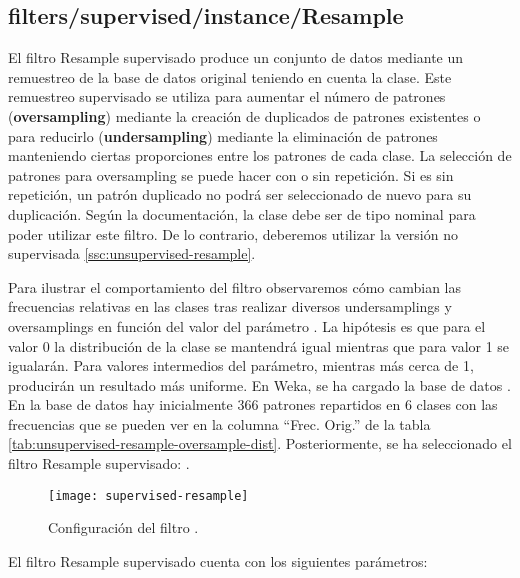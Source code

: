 \subsection{filters/supervised/instance/Resample}
\label{ssc:supervised-resample}
El filtro Resample supervisado produce un conjunto de datos mediante un remuestreo de la base de datos original teniendo en cuenta la clase. Este remuestreo supervisado se utiliza para aumentar el número de patrones (\textbf{oversampling}) mediante la creación de duplicados de patrones existentes o para reducirlo (\textbf{undersampling}) mediante la eliminación de patrones manteniendo ciertas proporciones entre los patrones de cada clase. La selección de patrones para oversampling se puede hacer con o sin repetición. Si es sin repetición, un patrón duplicado no podrá ser seleccionado de nuevo para su duplicación. Según la documentación, la clase debe ser de tipo nominal para poder utilizar este filtro. De lo contrario, deberemos utilizar la versión no supervisada \ref{ssc:unsupervised-resample}.

Para ilustrar el comportamiento del filtro observaremos cómo cambian las frecuencias relativas en las clases tras realizar diversos undersamplings y oversamplings en función del valor del parámetro . La hipótesis es que para el valor 0 la distribución de la clase se mantendrá igual mientras que para valor 1 se igualarán. Para valores intermedios del parámetro, mientras más cerca de 1, producirán un resultado más uniforme. En Weka, se ha cargado la base de datos . En la base de datos hay inicialmente 366 patrones repartidos en 6 clases con las frecuencias que se pueden ver en la columna ``Frec. Orig.'' de la tabla \ref{tab:unsupervised-resample-oversample-dist}. Posteriormente, se ha seleccionado el filtro Resample supervisado: .

\begin{figure}[ht]
    \centering
    \texttt{[image: supervised-resample]}
    \caption{Configuración del filtro .}
    \label{fig:supervised-resample}
\end{figure}
El filtro Resample supervisado cuenta con los siguientes parámetros:

